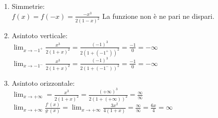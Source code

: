 \documentclass{book}
\begin{document}
\begin{enumerate}
\begin{itemize}
		\end{itemize}
	\item Simmetrie: \\
		$f(x)=f(-x)=\frac{-x^3}{2(1-x)^2}$ La funzione non è ne pari ne dispari.
	\item Asintoto verticale:\\
		$\lim_{x\to-1^+}\frac{x^3}{2(1+x)^2}=\frac{(-1)^3}{2(1+(-1^+))^2}=\frac{-1}{0}=-\infty$\\
		$\lim_{x\to-1^-}\frac{x^3}{2(1+x)^2}=\frac{(-1)^3}{2(1+(-1^-))^2}=\frac{-1}{0}=-\infty$
	\item Asintoto orizzontale:\\
		$\lim_{x\to+\infty}=\frac{x^3}{2(1+x)^2}=\frac{(+\infty)^3}{2(1+(+\infty))^2}=\frac{\infty}{\infty}$\\
		$\lim_{x\to+\infty}\frac{f^,(x)}{g^,(x)}=\lim_{x\to+\infty}\frac{3x^2}{4(1+x)}=\frac{\infty}{\infty}=\frac{6x}{4}=\infty$
		
\end{enumerate}
\printindex
\end{document}
